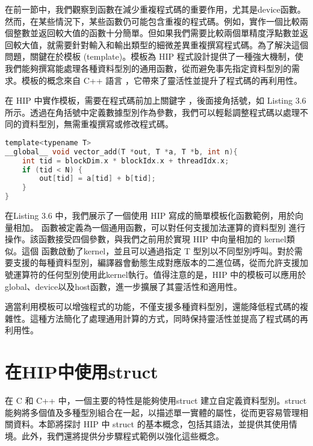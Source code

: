 在前一節中，我們觀察到函數在減少重複程式碼的重要作用，尤其是device函數。然而，在某些情況下，某些函數仍可能包含重複的程式碼。例如，實作一個比較兩個整數並返回較大值的函數十分簡單。但如果我們需要比較兩個單精度浮點數並返回較大值，就需要針對輸入和輸出類型的細微差異重複撰寫程式碼。為了解決這個問題，關鍵在於模板 (template)。模板為 HIP 程式設計提供了一種強大機制，使我們能夠撰寫能處理各種資料型別的通用函數，從而避免事先指定資料型別的需求。模板的概念來自 C++ 語言 \cite{67}，它帶來了靈活性並提升了程式碼的再利用性。

在 HIP 中實作模板，需要在程式碼前加上關鍵字 ，後面接角括號，如 Listing 3.6 所示。透過在角括號中定義數據型別作為參數，我們可以輕鬆調整程式碼以處理不同的資料型別，無需重複撰寫或修改程式碼。

\begin{lstlisting}[language=C, caption={在HIP kernel中使用模板}, label={6th:example}]
template<typename T>
__global__ void vector_add(T *out, T *a, T *b, int n){
    int tid = blockDim.x * blockIdx.x + threadIdx.x;
    if (tid < N) {
        out[tid] = a[tid] + b[tid];
    }
}
\end{lstlisting}

在Listing 3.6 中，我們展示了一個使用 HIP 寫成的簡單模板化函數範例，用於向量相加。 函數被定義為一個通用函數，可以對任何支援加法運算的資料型別  進行操作。該函數接受四個參數，與我們之前用於實現 HIP 中向量相加的  kernel類似。這個  函數啟動了kernel，並且可以通過指定 T 型別以不同型別呼叫。對於需要支援的每種資料型別，編譯器會動態生成對應版本的二進位碼，從而允許支援加號運算符的任何型別使用此kernel執行。值得注意的是，HIP 中的模板可以應用於global、device以及host函數，進一步擴展了其靈活性和適用性。

適當利用模板可以增強程式的功能，不僅支援多種資料型別，還能降低程式碼的複雜性。這種方法簡化了處理通用計算的方式，同時保持靈活性並提高了程式碼的再利用性。

\section{在HIP中使用struct}

在 C 和 C++ 中，一個主要的特性是能夠使用struct 建立自定義資料型別。struct 能夠將多個值及多種型別組合在一起，以描述單一實體的屬性，從而更容易管理相關資料。本節將探討 HIP 中 struct 的基本概念，包括其語法，並提供其使用情境。此外，我們還將提供分步驟程式範例以強化這些概念。

